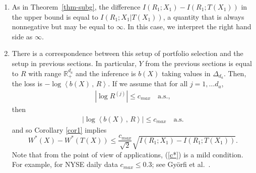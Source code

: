 \documentclass[11pt]{article}
\def\R{{\mathbb R}}
\newcommand\ip[2]{ \left\langle{#1} \, ,\, {#2} \right\rangle } %
\begin{document}
\begin{enumerate}[label=(\roman*)] 

\item  
As in Theorem~\ref{thm-subg}, the difference $I(R_1;X_1)-I(R_1;T(X_1))$ in the upper bound is equal to  $I(R_1;X_1|T(X_1))$, a quantity that is always nonnegative but may be equal to $\infty$. In this case, we interpret the right hand side as $\infty$. 
\item
There is a correspondence between this setup of portfolio selection and the setup in previous sections. In particular,  $Y$ from the previous sections is equal to $R$ with range $\R_+^{d_a}$ and the inference is $b(X)$ taking values in $\Delta_{d_a}$.
Then, the loss is $-\log\ip{b(X)}{R}$.
If we assume that for all $j=1,\dots d_a$, 
\begin{align}
\label{c*} 
|\log R^{(j)}|\le c_{max} \quad \text{a.s.}, 
\end{align}
then
\begin{align*}
|\log\ip{b(X)}{R}|\le c_{max} \quad \text{a.s.}
\end{align*}
and so Corollary  \ref{cor1} implies
\[
    W^*(X)-W^*(T(X))\le  \frac{c_{max}}{\sqrt{2}}\sqrt{I(R_1;X_1)-I(R_1;T(X_1))}.
\]
Note that from the point of view of applications, (\ref{c*}) is a mild condition. 
For example, for NYSE daily data $c_{max}\le 0.3$;  see  
Gy\"orfi et al.\  \cite{GyOtWa17}.
\end{enumerate} 
\end{document}
